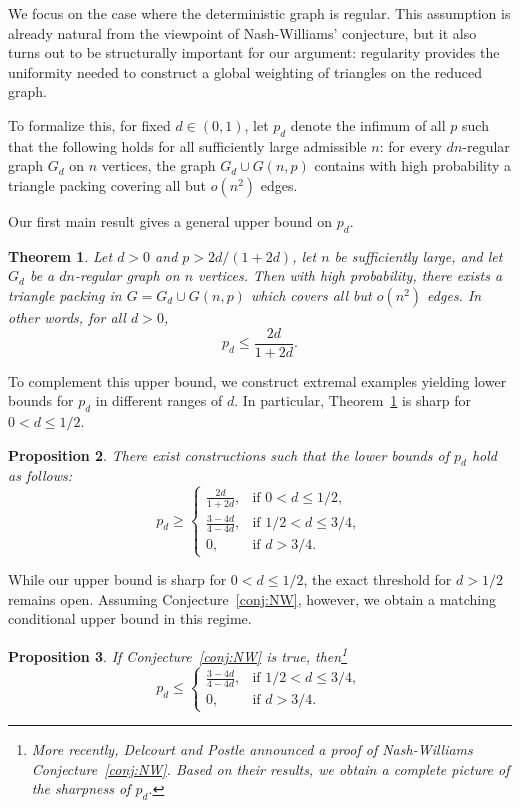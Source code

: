 \documentclass[11pt,reqno]{amsart}
\newtheorem{theorem}{Theorem}[section]
\newtheorem{proposition}[theorem]{Proposition}
\theoremstyle{definition}
\theoremstyle{remark}
\renewcommand\leq{\leqslant}
\renewcommand\geq{\geqslant}
\renewcommand\le{\leqslant}
\begin{document}
We focus on the case where the deterministic graph is regular. This assumption is already natural from the viewpoint of Nash-Williams' conjecture, but it also turns out to be structurally important for our argument: regularity provides the uniformity needed to construct a global weighting of triangles on the reduced graph.

To formalize this, for fixed $d\in(0,1)$, let $p_d$ denote the infimum of all $p$ such that the following holds for all sufficiently large admissible $n$: for every $dn$-regular graph $G_d$ on $n$ vertices, the graph $G_d\cup G(n,p)$ contains with high probability a triangle packing covering all but $o(n^2)$ edges.

Our first main result gives a general upper bound on $p_d$.

\begin{theorem}\label{thm:main}
Let $d>0$ and $p> 2d/(1+2d)$, let $n$ be sufficiently large, and let $G_d$ be a $dn$-regular graph on $n$ vertices. Then with high probability, there exists a triangle packing in $G=G_d\cup G(n,p)$ which covers all but $o(n^2)$ edges. In other words, for all $d>0$,
$$p_d\leq \frac{2d}{1+2d}.$$
\end{theorem}

To complement this upper bound, we construct extremal examples yielding lower bounds for $p_d$ in different ranges of $d$. In particular, Theorem~\ref{thm:main} is sharp for $0<d\le 1/2$.

\begin{proposition}\label{prop:lowforall}
There exist constructions such that the lower bounds of $p_d$ hold as follows: 
\begin{equation*}
p_d\geq
\begin{cases}
\frac{2d}{1+2d}, & \text{if } 0< d\leq 1/2, \\[4pt]
\frac{3-4d}{4-4d}, & \text{if } 1/2< d\leq 3/4, \\[4pt]
0, & \text{if } d>3/4.
\end{cases}
\end{equation*}
\end{proposition}

While our upper bound is sharp for $0<d\le 1/2$, the exact threshold for $d>1/2$ remains open. Assuming Conjecture~\ref{conj:NW}, however, we obtain a matching conditional upper bound in this regime.

\begin{proposition}\label{prop:fakeupper}
If Conjecture~\ref{conj:NW} is true, then\footnote{More recently, Delcourt and Postle \cite{DP2026} announced a proof of Nash-Williams Conjecture~\ref{conj:NW}. Based on their results, we obtain a complete picture of the sharpness of $p_d$.}
\[
p_d\le
\begin{cases}
\frac{3-4d}{4-4d}, & \text{if } 1/2<d\le 3/4,\\[4pt]
0, & \text{if } d>3/4.
\end{cases}
\]
\end{proposition}
\end{document}
